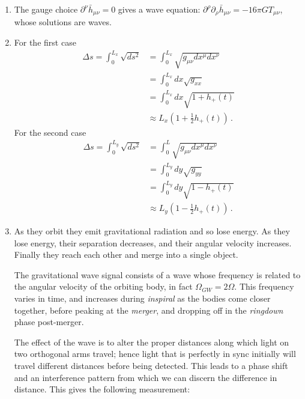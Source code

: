 \documentclass[12pt]{article}
\newcommand{\be}{\begin{equation}}
\newcommand{\ee}{\end{equation}}
\newcommand{\bh}{\bar{h}}
\begin{document}
\begin{enumerate}[label=\alph*)]
\item The gauge choice $\partial^\nu \bh_{\mu\nu} = 0$ gives a wave equation: $\partial^\rho\partial_\rho \bh_{\mu\nu} = - 16 \pi G T_{\mu\nu}$, whose solutions are waves.
\item For the first case
\be
\begin{split} 
\Delta s = \int_0^{L_x} \sqrt{ds^2} & = \int_0^{L_x} \sqrt{g_{\mu\nu} dx^\mu dx^\nu} \\
 & = \int_0^{L_x} dx \sqrt{g_{xx}} \\
 & = \int_0^{L_x} dx \sqrt{1+h_{+}(t)}\\
 & \approx {L_x} \left( 1 + \frac{1}{2} h_{+}(t) \right) \,.
\end{split}
\ee
For the second case
\be
\begin{split} 
\Delta s = \int_0^{L_y} \sqrt{ds^2} & = \int_0^L \sqrt{g_{\mu\nu} dx^\mu dx^\nu} \\
 & = \int_0^{L_y} dy \sqrt{g_{yy}} \\
 & = \int_0^{L_y} dy \sqrt{1-h_{+}(t)}\\
 & \approx {L_y} \left( 1 - \frac{1}{2} h_{+}(t) \right) \,.
\end{split}
\ee
\item As they orbit they emit gravitational radiation and so lose energy.
As they lose energy, their separation decreases, and their angular velocity increases.
Finally they reach each other and merge into a single object.

The gravitational wave signal consists of a wave whose frequency is related to the angular velocity of the orbiting body, in fact $\Omega_{GW} = 2 \Omega$.
This frequency varies in time, and increases during \emph{inspiral} as the bodies come closer together, before peaking at the \emph{merger}, and dropping off in the \emph{ringdown} phase post-merger. 

The effect of the wave is to alter the proper distances along which light on two orthogonal arms travel; hence light that is perfectly in sync initially will travel different distances before being detected. This leads to a phase shift and an interference pattern from which we can discern the difference in distance. 
This gives the following measurement:

\begin{figure}[h]
\centering
{}
\end{figure}
\end{enumerate}
\end{document}
